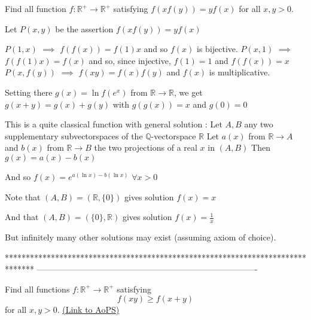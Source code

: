 \begin{solution}
	\begin{tcolorbox}Find all function $f:\mathbb{R}^+\rightarrow \mathbb{R}^+$ satisfying
 $f(xf(y))=yf(x)$ for all $x,y>0$.\end{tcolorbox}
Let $P(x,y)$ be the assertion $f(xf(y))=yf(x)$

$P(1,x)$ $\implies$ $f(f(x))=f(1)x$ and so $f(x)$ is bijective.
$P(x,1)$ $\implies$ $f(f(1)x)=f(x)$ and so, since injective, $f(1)=1$ and $f(f(x))=x$
$P(x,f(y))$ $\implies$ $f(xy)=f(x)f(y)$ and $f(x)$ is multiplicative.

Setting there $g(x)=\ln f(e^x)$ from $\mathbb R\to\mathbb R$, we get 
$g(x+y)=g(x)+g(y)$ with $g(g(x))=x$ and $g(0)=0$

This is a quite classical function with general solution :
Let $A,B$ any two supplementary subvectorspaces of the $\mathbb Q$-vectorspace $\mathbb R$
Let $a(x)$ from $\mathbb R\to A$ and $b(x)$ from $\mathbb R\to B$ the two projections of a real $x$ in $(A,B)$
Then $g(x)=a(x)-b(x)$

And so $f(x)=e^{a(\ln x)-b(\ln x)}$ $\forall x>0$

Note that $(A,B)=(\mathbb R,\{0\})$ gives solution $f(x)=x$

And that $(A,B)=(\{0\},\mathbb R)$ gives solution $f(x)=\frac 1x$

But infinitely many other solutions may exist (assuming axiom of choice).
\end{solution}
*******************************************************************************
-------------------------------------------------------------------------------

\begin{problem}
	Find all functions $f:\mathbb{R}^+ \rightarrow \mathbb{R}^+$ satisfying $$f(xy) \geq f(x+y)$$ for all $x,y>0$.
	\flushright \href{https://artofproblemsolving.com/community/c6h1590247}{(Link to AoPS)}
\end{problem}



